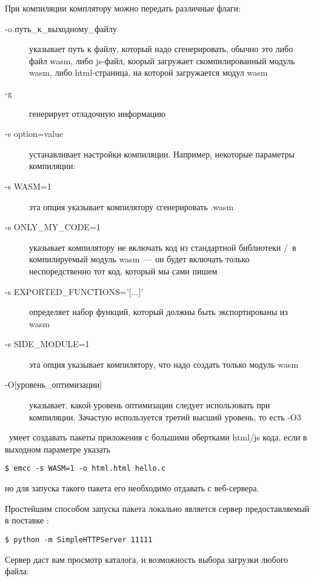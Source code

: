 При компиляции комплятору можно передать различные флаги:
\begin{description}

\item[-o путь\_к\_выходному\_файлу] указывает путь к файлу, который надо
сгенерировать, обычно это либо файл wasm, либо js-файл, коорый загружает
скомпилированный модуль wasm, либо html-страница, на которой загружается модул
wasm

\item[-g] генерирует отладочную информацию

\item[-s option=value] устанавливает настройки компиляции. Например, некоторые
параметры компиляции:

\item[-s WASM=1] эта опция указывает компилятору сгенерировать .wasm

\item[-s ONLY\_MY\_CODE=1] указывает компилятору не включать код из стандартной
библиотеки \emc/\cpp\ в компилируемый модуль wasm\ --- он будет включать только
неспоредственно тот код, который мы сами пишем

\item[-s EXPORTED\_FUNCTIONS='{[}...{]}'] определяет набор функций, который
должны быть экспортированы из wasm

\item[-s SIDE\_MODULE=1] эта опция указывает компилятору, что надо создать
только модуль wasm

\item[-O{[}уровень\_оптимизации{]}] указывает, какой уровень оптимизации следует
использовать при компиляции. Зачастую используется третий высший уровень, то
есть -O3

\end{description}


\ems\ умеет создавать пакеты приложения с большими обертками html/js кода, если
в выходном параметре указать
\begin{verbatim}
$ emcc -s WASM=1 -o html.html hello.c
\end{verbatim}
но для запуска такого пакета его необходимо отдавать с веб-сервера.

Простейшим способом запуска пакета локально является сервер предоставляемый в
поставке \py:
\begin{verbatim}
$ python -m SimpleHTTPServer 11111
\end{verbatim}

Сервер даст вам просмотр каталога, и возможность выбора загрузки любого файла:

\bigskip
{}

\secup


